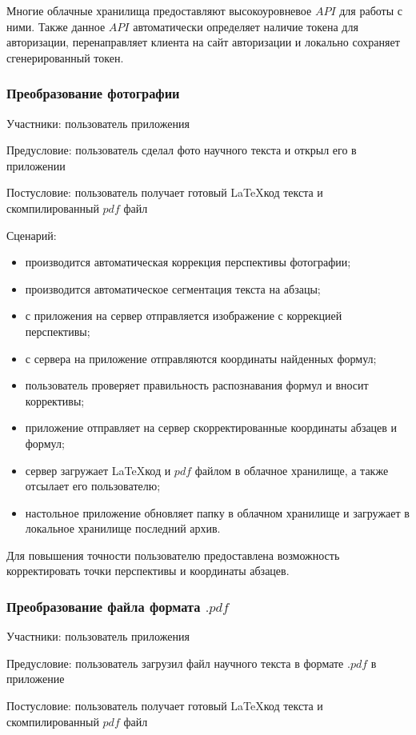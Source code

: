 Многие облачные хранилища предоставляют высокоуровневое $API$ для работы с ними. Также данное $API$ автоматически определяет наличие токена для авторизации, перенаправляет клиента на сайт авторизации и локально сохраняет сгенерированный токен.

\subsubsection{Преобразование фотографии}
Участники: пользователь приложения

Предусловие: пользователь сделал фото научного текста и открыл его в приложении

Постусловие: пользователь получает готовый \LaTeX\-код текста и скомпилированный $pdf$ файл

Сценарий:
\begin{itemize}
    \item производится автоматическая коррекция перспективы фотографии;
    \item производится автоматическое сегментация текста на абзацы;
    \item с приложения на сервер отправляется изображение с коррекцией перспективы;
    \item с сервера на приложение отправляются координаты найденных формул;
    \item пользователь проверяет правильность распознавания формул и вносит коррективы;
    \item приложение отправляет на сервер скорректированные координаты абзацев и формул;
    \item сервер загружает \LaTeX\-код и $pdf$ файлом в облачное хранилище, а также отсылает его пользователю;
    \item настольное приложение обновляет папку в облачном хранилище и загружает в локальное хранилище последний архив.
\end{itemize}

Для повышения точности пользователю предоставлена возможность корректировать точки перспективы и координаты абзацев.
\subsubsection{Преобразование файла формата $.pdf$}
Участники: пользователь приложения

Предусловие: пользователь загрузил файл научного текста в формате $.pdf$ в приложение

Постусловие: пользователь получает готовый \LaTeX\-код текста и скомпилированный $pdf$ файл

